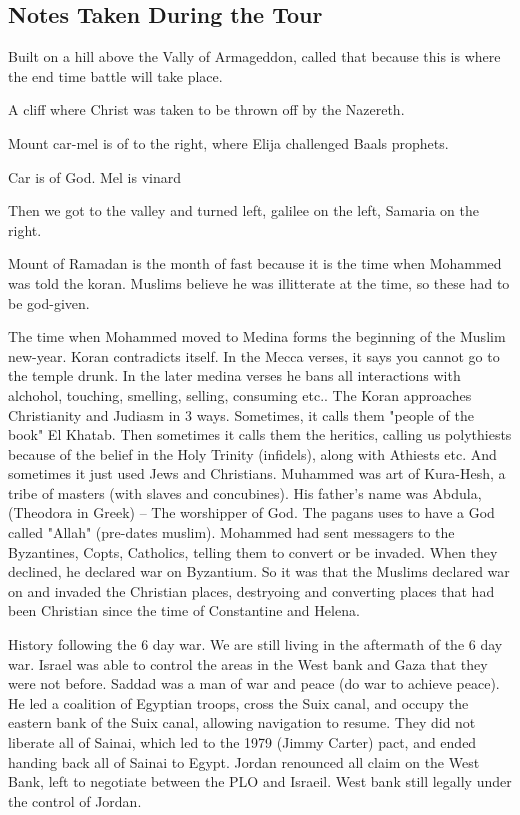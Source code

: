 \documentclass[letterpaper]{report}
\begin{document}
\subsection{Notes Taken During the Tour}
Built on a hill above the Vally of Armageddon, called that because this is where the end time battle will take place.

A cliff where Christ was taken to be thrown off by the Nazereth.

Mount car-mel is of to the right, where Elija challenged Baals prophets.

Car is of God.
Mel is vinard

Then we got to the valley and turned left, galilee on the left, Samaria on the right.

Mount of Ramadan is the month of fast because it is the time when Mohammed was told the koran.  Muslims believe he was illitterate at the time, so these had to be god-given.

The time when Mohammed moved to Medina forms the beginning of the Muslim new-year. 
Koran contradicts itself. In the Mecca verses, it says you cannot go to the temple drunk.  In the later medina verses he bans all interactions with alchohol, touching, smelling, selling, consuming etc..
The Koran approaches Christianity and Judiasm in 3 ways.
Sometimes, it calls them "people of the book" El Khatab.
Then sometimes it calls them the heritics, calling us polythiests because of the belief in the Holy Trinity (infidels), along with Athiests etc.
And sometimes it just used Jews and Christians.
Muhammed was art of Kura-Hesh, a tribe of masters (with slaves and concubines).
His father's name was Abdula, (Theodora in Greek) -- The worshipper of God. The pagans uses to have a God called "Allah" (pre-dates muslim). 
Mohammed had sent messagers to the Byzantines, Copts, Catholics, telling them to convert or be invaded.
When they declined, he declared war on Byzantium. So it was that the Muslims declared war on and invaded the Christian places, destryoing and converting places that had been Christian since the time of Constantine and Helena.

History following the 6 day war.
We are still living in the aftermath of the 6 day war.  Israel was able to control the areas in the West bank and Gaza that they were not before.
Saddad was a man of war and peace (do war to achieve peace). He led a coalition of Egyptian troops, cross the Suix canal, and occupy the eastern bank of the Suix canal, allowing navigation to resume. They did not liberate all of Sainai, which led to the 1979 (Jimmy Carter) pact, and ended handing back all of Sainai to Egypt.  Jordan renounced all claim on the West Bank, left to negotiate between the PLO and Israeil.  West bank still legally under the control of Jordan.
\end{document}
